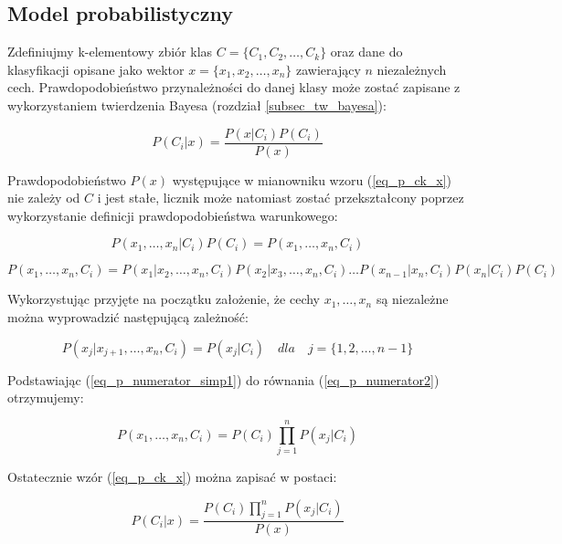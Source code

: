 \documentclass[10pt,a4paper]{article}
\begin{document}
\subsection{Model probabilistyczny}
\label{subsec_model}

Zdefiniujmy k-elementowy zbiór klas $C = {\{C_1, C_2, \dots, C_k\}}$ oraz dane do klasyfikacji opisane jako wektor ${x = \{x_1, x_2, \dots, x_n\}}$ zawierający $n$ niezależnych cech. Prawdopodobieństwo przynależności do danej klasy może zostać zapisane z wykorzystaniem twierdzenia Bayesa (rozdział \ref{subsec_tw_bayesa}):

	\begin{equation}
	\label{eq_p_ck_x}
		P(C_i | x) = \frac{P(x | C_i) P(C_i)}{P(x)}
	\end{equation}

Prawdopodobieństwo $P(x)$ występujące w mianowniku wzoru (\ref{eq_p_ck_x}) nie zależy od $C$ i jest stałe, licznik może natomiast zostać przekształcony poprzez wykorzystanie definicji prawdopodobieństwa warunkowego:

	\begin{equation}
	\label{eq_p_numerator1}
		P(x_1, \dots , x_n | C_i)P(C_i) = P(x_1, \dots, x_n, C_i)
	\end{equation}

	\begin{equation}
	\label{eq_p_numerator2}
		P(x_1, \dots, x_n, C_i) = P(x_1 | x_2 , \dots , x_n, C_i)P(x_2 | x_3, \dots , x_n, 	C_i) \dots P(x_{n-1} | x_n, C_i)P(x_n | C_i)P(C_i)
	\end{equation}
	
Wykorzystując przyjęte na początku założenie, że cechy ${x_1, \dots, x_n}$ są niezależne można wyprowadzić następującą zależność:

	\begin{equation}
	\label{eq_p_numerator_simp1}
		P(x_j | x_{j+1}, \dots , x_n, C_i) = P(x_j | C_i) \quad dla \quad j = \{1, 2, \dots, n-1\}
	\end{equation}

Podstawiając (\ref{eq_p_numerator_simp1}) do równania (\ref{eq_p_numerator2}) otrzymujemy:
	
	\begin{equation}
	\label{eq_p_numerator_simp2}
		P(x_1, \dots, x_n, C_i) = P(C_i) \prod_{j = 1}^n P(x_j | C_i)
	\end{equation}

Ostatecznie wzór (\ref{eq_p_ck_x}) można zapisać w postaci:

	\begin{equation}
	\label{eq_p_ck_x_simp}
		P(C_i | x) = \frac{P(C_i) \prod_{j = 1}^n P(x_j | C_i)}{P(x)}
	\end{equation}

	
\end{document}
